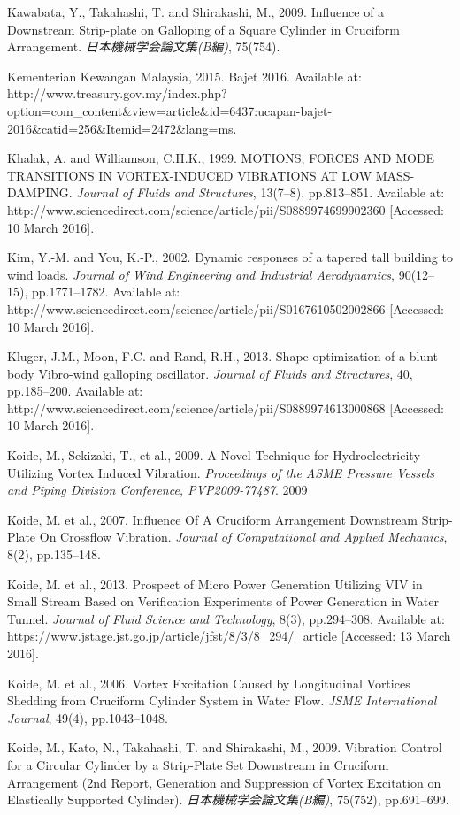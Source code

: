 \documentclass[]{article}
\begin{document}
Kawabata, Y., Takahashi, T. and Shirakashi, M., 2009. Influence of a
Downstream Strip-plate on Galloping of a Square Cylinder in Cruciform
Arrangement. \emph{日本機械学会論文集(B編)}, 75(754).

Kementerian Kewangan Malaysia, 2015. Bajet 2016. Available at:
http://www.treasury.gov.my/index.php?option=com\_content\&view=article\&id=6437:ucapan-bajet-2016\&catid=256\&Itemid=2472\&lang=ms.

Khalak, A. and Williamson, C.H.K., 1999. MOTIONS, FORCES AND MODE
TRANSITIONS IN VORTEX-INDUCED VIBRATIONS AT LOW MASS-DAMPING.
\emph{Journal of Fluids and Structures}, 13(7--8), pp.813--851.
Available at:
http://www.sciencedirect.com/science/article/pii/S0889974699902360
{[}Accessed: 10 March 2016{]}.

Kim, Y.-M. and You, K.-P., 2002. Dynamic responses of a tapered tall
building to wind loads. \emph{Journal of Wind Engineering and Industrial
Aerodynamics}, 90(12--15), pp.1771--1782. Available at:
http://www.sciencedirect.com/science/article/pii/S0167610502002866
{[}Accessed: 10 March 2016{]}.

Kluger, J.M., Moon, F.C. and Rand, R.H., 2013. Shape optimization of a
blunt body Vibro-wind galloping oscillator. \emph{Journal of Fluids and
Structures}, 40, pp.185--200. Available at:
http://www.sciencedirect.com/science/article/pii/S0889974613000868
{[}Accessed: 10 March 2016{]}.

Koide, M., Sekizaki, T., et al., 2009. A Novel Technique for
Hydroelectricity Utilizing Vortex Induced Vibration. \emph{Proceedings
of the ASME Pressure Vessels and Piping Division Conference,
PVP2009-77487}. 2009

Koide, M. et al., 2007. Influence Of A Cruciform Arrangement Downstream
Strip-Plate On Crossflow Vibration. \emph{Journal of Computational and
Applied Mechanics}, 8(2), pp.135--148.

Koide, M. et al., 2013. Prospect of Micro Power Generation Utilizing VIV
in Small Stream Based on Verification Experiments of Power Generation in
Water Tunnel. \emph{Journal of Fluid Science and Technology}, 8(3),
pp.294--308. Available at:
https://www.jstage.jst.go.jp/article/jfst/8/3/8\_294/\_article
{[}Accessed: 13 March 2016{]}.

Koide, M. et al., 2006. Vortex Excitation Caused by Longitudinal
Vortices Shedding from Cruciform Cylinder System in Water Flow.
\emph{JSME International Journal}, 49(4), pp.1043--1048.

Koide, M., Kato, N., Takahashi, T. and Shirakashi, M., 2009. Vibration
Control for a Circular Cylinder by a Strip-Plate Set Downstream in
Cruciform Arrangement (2nd Report, Generation and Suppression of Vortex
Excitation on Elastically Supported Cylinder).
\emph{日本機械学会論文集(B編)}, 75(752), pp.691--699.
\end{document}
